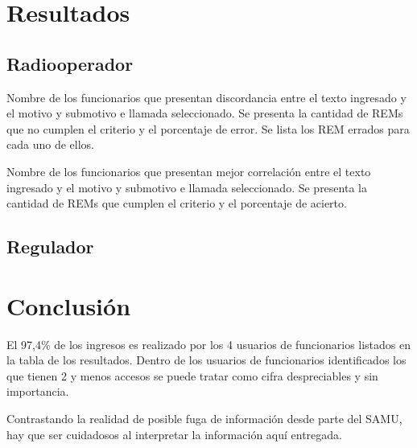 \documentclass{article}
\begin{document}
\section{Resultados}

\subsection{Radiooperador}




\begin{table}[h]
\centering

\caption{Nombre de los funcionarios que presentan discordancia entre el texto ingresado y el motivo y submotivo e llamada seleccionado. Se presenta la cantidad de REMs que no cumplen el criterio y el porcentaje de error. Se lista los REM errados para cada uno de ellos.}
\end{table}


\begin{table}[h]
\centering

\caption{Nombre de los funcionarios que presentan mejor correlación entre el texto ingresado y el motivo y submotivo e llamada seleccionado. Se presenta la cantidad de REMs que cumplen el criterio y el porcentaje de acierto.}
\end{table}






\subsection{Regulador}





\section{Conclusión}
El 97,4\% de los ingresos es realizado por  los 4 usuarios de funcionarios listados en la tabla de los resultados. Dentro de los usuarios de funcionarios identificados los que tienen 2 y menos accesos se puede tratar como cifra despreciables y sin importancia.

Contrastando la realidad de posible fuga de información desde parte del SAMU, hay que ser cuidadosos al interpretar la información aquí entregada.
\end{document}
